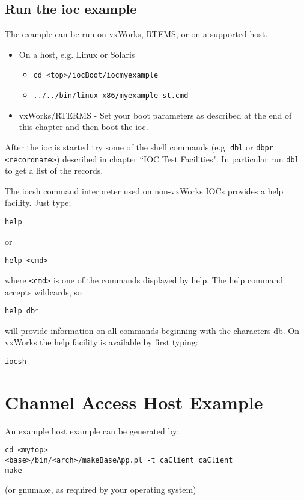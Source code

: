 \subsection{Run the ioc example}

The example can be run on vxWorks, RTEMS, or on a supported host.

\begin{itemize}
\item On a host, e.g. Linux or Solaris

\begin{itemize}
\item \verb|cd <top>/iocBoot/iocmyexample|
\item \verb|../../bin/linux-x86/myexample st.cmd|
\end{itemize}
\item vxWorks/RTERMS - Set your boot parameters as described at the end of this chapter and then boot the ioc.
\end{itemize}
After the ioc is started try some of the shell commands (e.g. \verb|dbl| or \verb|dbpr <recordname>|) described in chapter ``IOC 
Test Facilities". In particular run \verb|dbl| to get a list of the records.

The iocsh command interpreter used on non-vxWorks IOCs provides a help facility. Just type:

\begin{verbatim}help\end{verbatim}
or
\begin{verbatim}help <cmd>\end{verbatim}
where \verb|<cmd>| is one of the commands displayed by help.  The help command accepts wildcards, so
\begin{verbatim}help db*\end{verbatim}
will provide information on all commands beginning with the characters db.
On vxWorks the help facility is available by first typing:

\begin{verbatim}iocsh\end{verbatim}

\section{Channel Access Host Example}

An example host example can be generated by:

\begin{verbatim}
cd <mytop>
<base>/bin/<arch>/makeBaseApp.pl -t caClient caClient
make
\end{verbatim}
(or gnumake, as required by your operating system)

